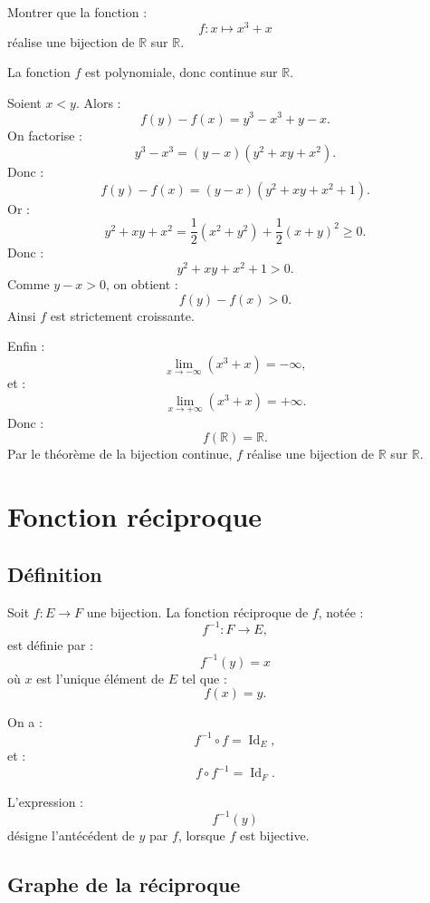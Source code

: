 \documentclass[11pt,a4paper]{article}
\newcommand{\R}{\mathbb R}
\newcommand{\Id}{\operatorname{Id}}
\begin{document}
\begin{exercicebox}
Montrer que la fonction :
\[
f:x\mapsto x^3+x
\]
réalise une bijection de \(\R\) sur \(\R\).
\end{exercicebox}

\begin{correctionbox}
La fonction \(f\) est polynomiale, donc continue sur \(\R\).

Soient \(x<y\).  
Alors :
\[
f(y)-f(x)=y^3-x^3+y-x.
\]
On factorise :
\[
y^3-x^3=(y-x)(y^2+xy+x^2).
\]
Donc :
\[
f(y)-f(x)=(y-x)(y^2+xy+x^2+1).
\]
Or :
\[
y^2+xy+x^2
=
\frac12(x^2+y^2)+\frac12(x+y)^2
\geq0.
\]
Donc :
\[
y^2+xy+x^2+1>0.
\]
Comme \(y-x>0\), on obtient :
\[
f(y)-f(x)>0.
\]
Ainsi \(f\) est strictement croissante.

Enfin :
\[
\lim_{x\to-\infty}(x^3+x)=-\infty,
\]
et :
\[
\lim_{x\to+\infty}(x^3+x)=+\infty.
\]
Donc :
\[
f(\R)=\R.
\]
Par le théorème de la bijection continue, \(f\) réalise une bijection de \(\R\) sur \(\R\).
\end{correctionbox}

\section{Fonction réciproque}

\subsection{Définition}

\begin{definitionbox}
Soit \(f:E\to F\) une bijection.  
La fonction réciproque de \(f\), notée :
\[
f^{-1}:F\to E,
\]
est définie par :
\[
f^{-1}(y)=x
\]
où \(x\) est l'unique élément de \(E\) tel que :
\[
f(x)=y.
\]
\end{definitionbox}

On a :
\[
f^{-1}\circ f=\Id_E,
\]
et :
\[
f\circ f^{-1}=\Id_F.
\]

\begin{retenirbox}
L'expression :
\[
f^{-1}(y)
\]
désigne l'antécédent de \(y\) par \(f\), lorsque \(f\) est bijective.
\end{retenirbox}

\subsection{Graphe de la réciproque}
\end{document}
